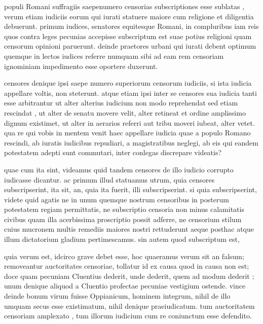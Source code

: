  populi Romani suffragiis saepenumero censorias subscriptiones esse sublatas , verum etiam iudiciis eorum qui iurati statuere maiore cum religione et diligentia debuerunt. primum iudices, senatores equitesque Romani, in compluribus iam reis quos contra leges pecunias accepisse subscriptum est suae potius religioni quam censorum opinioni paruerunt. deinde praetores urbani qui iurati debent optimum quemque in lectos iudices referre numquam sibi ad eam rem censoriam ignominiam impedimento esse oportere duxerunt.

 censores denique ipsi saepe numero superiorum censorum iudiciis, si ista iudicia appellare voltis, non steterunt. atque etiam ipsi inter se censores sua iudicia tanti esse arbitrantur ut alter alterius iudicium non modo reprehendat sed etiam rescindat , ut alter de senatu movere velit, alter retineat et ordine amplissimo dignum existimet, ut alter in aerarios referri aut tribu moveri iubeat, alter vetet. qua re qui vobis in mentem venit haec appellare iudicia quae a populo Romano rescindi, ab iuratis iudicibus repudiari, a magistratibus neglegi, ab eis qui eandem potestatem adepti sunt commutari, inter conlegas discrepare videatis?

 quae cum ita sint, videamus quid tandem censores de illo iudicio corrupto iudicasse dicantur. ac primum illud statuamus utrum, quia censores subscripserint, ita sit, an, quia ita fuerit, illi subscripserint. si quia subscripserint, videte quid agatis ne in unum quemque nostrum censoribus in posterum potestatem regiam permittatis, ne subscriptio censoria non minus calamitatis civibus quam illa acerbissima proscriptio possit adferre, ne censorium stilum cuius mucronem multis remediis maiores nostri rettuderunt aeque posthac atque illum dictatorium gladium pertimescamus. sin autem quod subscriptum est,

 quia verum est, idcirco grave debet esse, hoc quaeramus verum sit an falsum; removeantur auctoritates censoriae, tollatur id ex causa quod in causa non est; doce quam pecuniam Cluentius dederit, unde dederit, quem ad modum dederit ; unum denique aliquod a Cluentio profectae pecuniae vestigium ostende. vince deinde bonum virum fuisse Oppianicum, hominem integrum, nihil de illo umquam secus esse existimatum, nihil denique praeiudicatum. tum auctoritatem censoriam amplexato , tum illorum iudicium cum re coniunctum esse defendito.

